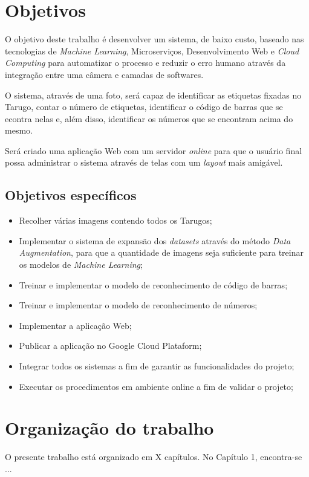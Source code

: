 \section{Objetivos} 

O objetivo deste trabalho é desenvolver um sistema, de baixo custo, baseado nas tecnologias de \textit{Machine Learning}, Microserviços, Desenvolvimento Web e \textit{Cloud Computing} para automatizar o processo e reduzir o erro humano através da integração entre uma câmera e camadas de softwares. 

O sistema, através de uma foto, será capaz de identificar as etiquetas fixadas no Tarugo, contar o número de etiquetas, identificar o código de barras que se econtra nelas e, além disso, identificar os números que se encontram acima do mesmo.

Será criado uma aplicação Web com um servidor \textit{online} para que o usuário final possa administrar o sistema através de telas com um \textit{layout} mais amigável.

\subsection{Objetivos específicos}

\begin{itemize}
	\item Recolher várias imagens contendo todos os Tarugos;
	\item Implementar o sistema de expansão dos \textit{datasets} através do método \textit{Data Augmentation}, para que a quantidade de imagens seja suficiente para treinar os modelos de \textit{Machine Learning};
	\item Treinar e implementar o modelo de reconhecimento de código de barras;
	\item Treinar e implementar o modelo de reconhecimento de números;
	\item Implementar a aplicação Web;
	\item Publicar a aplicação no Google Cloud Plataform;
	\item Integrar todos os sistemas a fim de garantir as funcionalidades do projeto;
	\item Executar os procedimentos em ambiente online a fim de validar o projeto;
\end{itemize}


\section{Organização do trabalho}

O presente trabalho está organizado em X capítulos. No Capítulo 1, encontra-se ... 